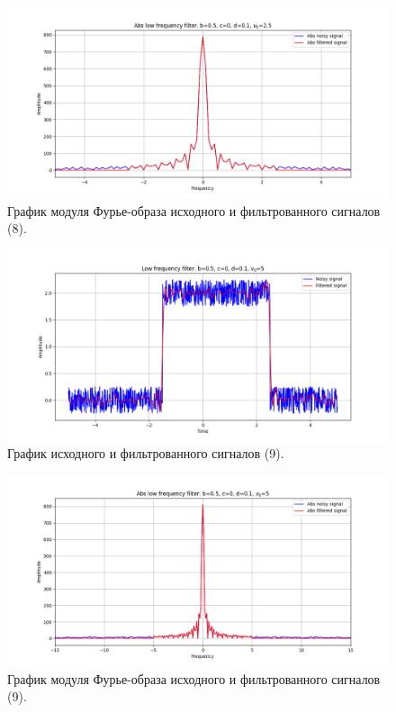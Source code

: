 \documentclass[a4paper, 12pt]{article}
\begin{document}
    \begin{figure}[!htb]
        \centering
        \includegraphics[scale=0.48]{13_abs_u_U_nohigh.png}
        \captionsetup{skip=0pt}
        \caption{График модуля Фурье-образа исходного и фильтрованного сигналов (8).}
        \label{fig:fig16}
    \end{figure}
    \begin{figure}[!htb]
        \centering
        \includegraphics[scale=0.48]{8_u_flt_u_nohigh.png}
        \captionsetup{skip=0pt}
        \caption{График исходного и фильтрованного сигналов (9).}
        \label{fig:fig17}
    \end{figure}
    \begin{figure}[!htb]
        \centering
        \includegraphics[scale=0.48]{8_abs_u_U_nohigh.png}
        \captionsetup{skip=0pt}
        \caption{График модуля Фурье-образа исходного и фильтрованного сигналов (9).}
        \label{fig:fig18}
    \end{figure}
\end{document}
